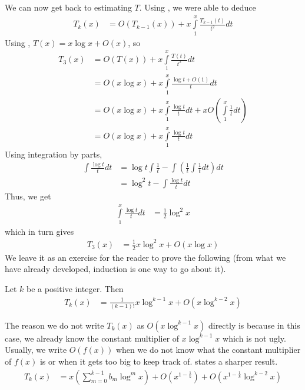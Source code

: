 \documentclass[elemannt.tex]{subfile}
\begin{document}
	We can now get back to estimating $T$. Using , we were able to deduce
		\begin{align*}
			T_{k}(x)
				& = O\left(T_{k-1}(x)\right)+x\int\limits_{1}^{x}\frac{T_{k-1}(t)}{t^{2}}dt
		\end{align*}
	Using , $T(x)=x\log{x}+O(x)$, so
		\begin{align*}
			T_{3}(x)
				& = O(T(x))+x\int\limits_{1}^{x}\frac{T(t)}{t^{2}}dt\\
				& = O(x\log{x})+x\int\limits_{1}^{x}\frac{\log{t}+O(1)}{t}dt\\
				& = O(x\log{x})+x\int\limits_{1}^{x}\frac{\log{t}}{t}dt+xO\left(\int\limits_{1}^{x}\frac{1}{t}dt\right)\\
				& = O(x\log{x})+x\int\limits_{1}^{x}\frac{\log{t}}{t}dt
		\end{align*}
	Using integration by parts,
		\begin{align*}
			\int\frac{\log{t}}{t}dt
				& = \log{t}\int\frac{1}{t}-\int\left(\frac{1}{t}\int\frac{1}{t}dt\right)dt\\
				& = \log^{2}{t}-\int\frac{\log{t}}{t}dt
		\end{align*}
	Thus, we get
		\begin{align*}
			\int\limits_{1}^{x}\frac{\log{t}}{t}dt
				& = \frac{1}{2}\log^{2}{x}
		\end{align*}
	which in turn gives
		\begin{align*}
			T_{3}(x)
				& = \frac{1}{2}x\log^{2}{x}+O(x\log{x})
		\end{align*}
	We leave it as an exercise for the reader to prove the following (from what we have already developed, induction is one way to go about it).
		\begin{theorem}
			Let $k$ be a positive integer. Then
				\begin{align*}
					T_{k}(x)
						& = \frac{1}{(k-1)!}x\log^{k-1}{x}+O\left(x\log^{k-2}{x}\right)
				\end{align*}
		\end{theorem}
	The reason we do not write $T_{k}(x)$ as $O\left(x\log^{k-1}{x}\right)$ directly is because in this case, we already know the constant multiplier of $x\log^{k-1}{x}$ which is not ugly. Usually, we write $O(f(x))$ when we do not know what the constant multiplier of $f(x)$ is or when it gets too big to keep track of. \textcite[Page $2$]{landau_1912_0} states a sharper result.
		\begin{align*}
			T_{k}(x)
				& = x\left(\sum_{m=0}^{k-1}b_{m}\log^{m}{x}\right)+O\left(x^{1-\frac{1}{k}}\right)+O\left(x^{1-\frac{1}{k}}\log^{k-2}{x}\right)
		\end{align*}
\end{document}
